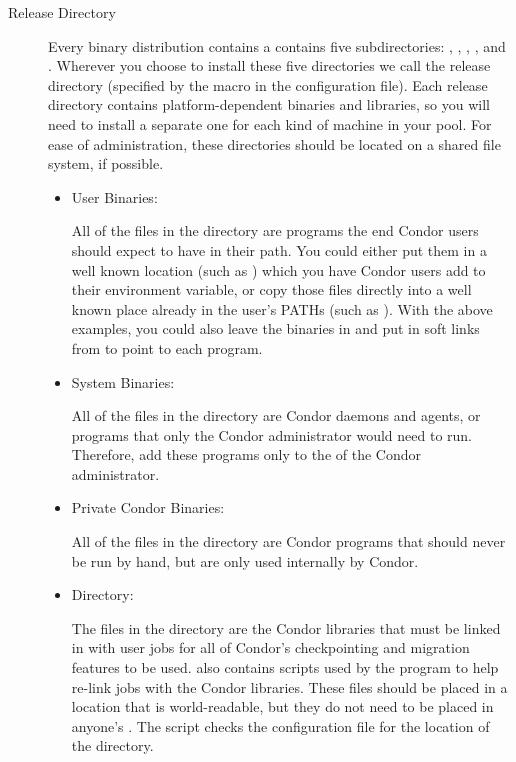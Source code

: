 \begin{description}
\begin{description}
\item[Release Directory]

Every binary distribution contains a contains
five subdirectories: , , , ,
and . Wherever you
choose to install these five directories we call the release directory
(specified by the  macro in the configuration file).
Each
release directory contains platform-dependent binaries and libraries,
so you will need to install a separate one for each kind of machine in
your pool.  For ease of administration, these directories should be
located on a shared file system, if possible.

\begin{itemize}
     \item User Binaries:

     All of the files in the  directory are programs the end
     Condor users should expect to have in their path.  You could
     either put them in a well known location (such as
     ) which you have Condor users add to
     their  environment variable, or copy those files
     directly into a well known place already in the user's PATHs (such as
     ).  With the above examples, you could also
     leave the binaries in  and put in
     soft links from  to point to each program.

     \item System Binaries:

     All of the files in the  directory are Condor daemons and
     agents, or programs that only the Condor administrator would need
     to run.  Therefore, add these programs only
     to the  of the Condor administrator.

     \item Private Condor Binaries:

     All of the files in the  directory are Condor
     programs that should never be run by hand, but are only used
     internally by Condor. 

     \item {} Directory:

     The files in the  directory are the Condor libraries that
     must be linked in with user jobs for all of Condor's
     checkpointing and migration features to be used.   also
     contains scripts used by the  program to help
     re-link jobs with the Condor libraries.  These files should be
     placed in a location that is world-readable, but they do not need
     to be placed in anyone's .  The  script checks
     the configuration file for the location of the  directory.


\end{itemize}
\end{description}
\end{description}
